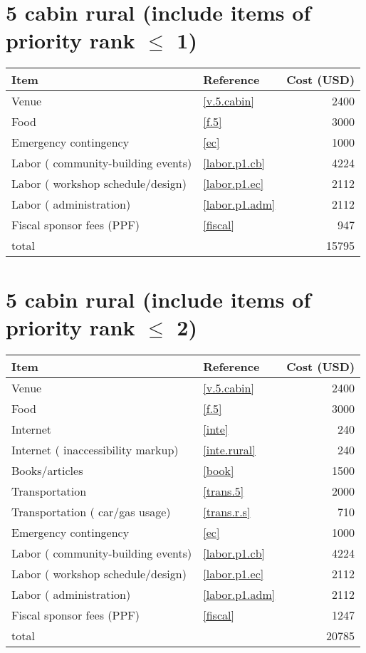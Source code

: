 \section*{5 cabin rural (include items of priority rank $\leq$ 1)}
\begin{center}
\begin{tabular}{llr}
Item & Reference & Cost (USD) \\ \hline
Venue & \ref{v.5.cabin} & 2400 \\
Food & \ref{f.5} & 3000 \\
Emergency contingency & \ref{ec} & 1000 \\
Labor ( community-building events) & \ref{labor.p1.cb} & 4224 \\
Labor ( workshop schedule/design) & \ref{labor.p1.ec} & 2112 \\
Labor ( administration) & \ref{labor.p1.adm} & 2112 \\
Fiscal sponsor fees (PPF) & \ref{fiscal} & 947 \\ \hline
total &  & 15795
\end{tabular}
\end{center}
\newpage
\section*{5 cabin rural (include items of priority rank $\leq$ 2)}
\begin{center}
\begin{tabular}{llr}
Item & Reference & Cost (USD) \\ \hline
Venue & \ref{v.5.cabin} & 2400 \\
Food & \ref{f.5} & 3000 \\
Internet & \ref{inte} & 240 \\
Internet ( inaccessibility markup) & \ref{inte.rural} & 240 \\
Books/articles & \ref{book} & 1500 \\
Transportation & \ref{trans.5} & 2000 \\
Transportation ( car/gas usage) & \ref{trans.r.s} & 710 \\
Emergency contingency & \ref{ec} & 1000 \\
Labor ( community-building events) & \ref{labor.p1.cb} & 4224 \\
Labor ( workshop schedule/design) & \ref{labor.p1.ec} & 2112 \\
Labor ( administration) & \ref{labor.p1.adm} & 2112 \\
Fiscal sponsor fees (PPF) & \ref{fiscal} & 1247 \\ \hline
total &  & 20785
\end{tabular}
\end{center}
\newpage
